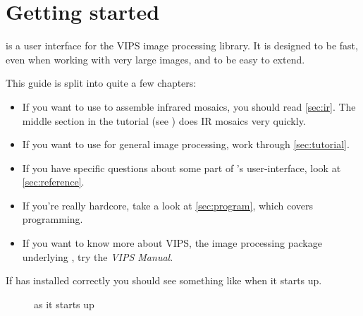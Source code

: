 \chapter{Getting started}

\noindent
\nip{} is a user interface for the VIPS image processing library. It is
designed to be fast, even when working with very large images, and to
be easy to extend.  

This guide is split into quite a few chapters:

\begin{itemize}

\item
If you want to use \nip{} to assemble infrared mosaics, you should read
\cref{sec:ir}. The middle section in the tutorial (see )
does IR mosaics very quickly.

\item
If you want to use \nip{} for general image processing, work through 
\cref{sec:tutorial}.

\item
If you have specific questions about some part of \nip{}'s user-interface, look
at \cref{sec:reference}.

\item
If you're really hardcore, take a look at \cref{sec:program}, which covers
programming.

\item
If you want to know more about VIPS, the image processing package
underlying \nip{}, try the \emph{VIPS Manual}.

\end{itemize}

If \nip{} has installed correctly you should see something like
 when it starts up.

\begin{figure}
\caption{\nip{} as it starts up}
\label{fg:introwin}
\end{figure}

